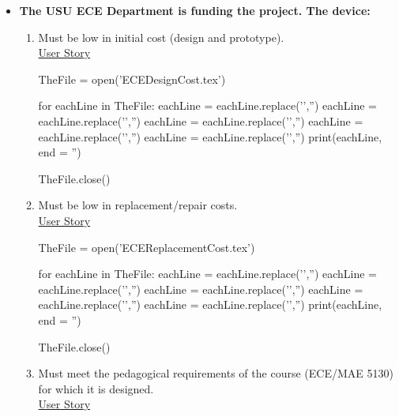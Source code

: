 \begin{itemize}
\begin{enumerate}
	\end{enumerate}
	\item {\textbf{The USU ECE Department is funding the project.  The device:}}
	\begin{enumerate}
		\item Must be low in initial cost (design and prototype).\\[.5cm] \underline{User Story}\\
		
\begin{python}
TheFile = open('ECEDesignCost.tex')

for eachLine in TheFile:
    eachLine = eachLine.replace('','')
    eachLine = eachLine.replace('','')
    eachLine = eachLine.replace('','')
    eachLine = eachLine.replace('','')
    eachLine = eachLine.replace('','')
    print(eachLine, end = '')
		
TheFile.close()
\end{python}
\bigskip
		
		\item Must be low in replacement/repair costs.\\[.5cm] \underline{User Story}\\
		
\begin{python}
TheFile = open('ECEReplacementCost.tex')

for eachLine in TheFile:
    eachLine = eachLine.replace('','')
    eachLine = eachLine.replace('','')
    eachLine = eachLine.replace('','')
    eachLine = eachLine.replace('','')
    eachLine = eachLine.replace('','')
    print(eachLine, end = '')
		
TheFile.close()
\end{python}
\bigskip
		
		\item Must meet the pedagogical requirements of the course (ECE/MAE 5130) for which it is designed.\\[.5cm] \underline{User Story}\\
		

\end{enumerate}
\end{itemize}
